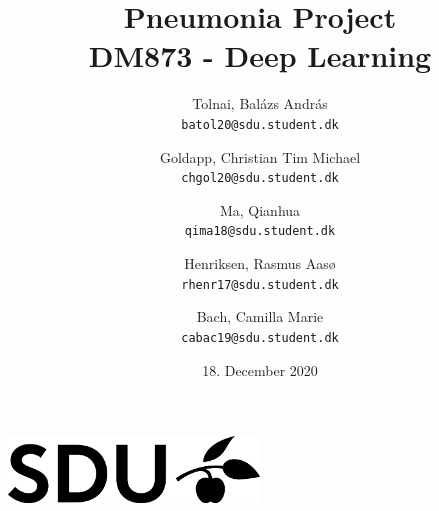 \documentclass[11pt]{article}
\author{
	Tolnai, Balázs András\\
 	\texttt{batol20@sdu.student.dk}
  	\and  
  	Goldapp, Christian Tim Michael\\
  	\texttt{chgol20@sdu.student.dk}
  	\and
  	Ma, Qianhua\\
  	\texttt{qima18@sdu.student.dk}
  	\and
  	Henriksen, Rasmus Aasø\\
  	\texttt{rhenr17@sdu.student.dk}
  	\and
  	Bach, Camilla Marie\\
  	\texttt{cabac19@sdu.student.dk}
}
\date{18. December 2020}
\title{%
  \textbf{Pneumonia Project} \\
  \vspace{10mm}
  \large DM873 - Deep Learning}
\begin{document}
	\maketitle
	\thispagestyle{empty}
	\vspace{1.8cm}
       	\begin{center}
       		\includegraphics[width=0.5\textwidth]{SDU_BLACK_RGB}
       	\end{center}
	 	\vspace{1.8cm}
	\newpage


	

	

	

	
	
\end{document}
